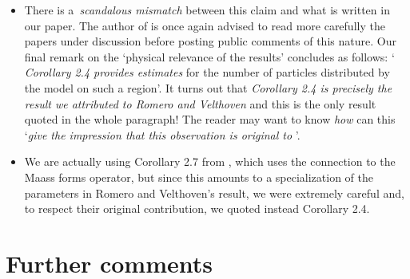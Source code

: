 \documentclass[11pt,reqno]{amsart}
\numberwithin{equation}{section}
\theoremstyle{plain}
\theoremstyle{definition}
\theoremstyle{remark}
\begin{document}
\begin{itemize}
\item There is a\emph{\ scandalous mismatch} between this claim and what is
written in our paper. The author of \cite{Letter} is once again advised to
read more carefully the papers under discussion before posting public
comments of this nature. Our final remark on the `physical relevance of the
results' \cite[Page 9, line -6]{Affine} concludes as follows: `\emph{%
Corollary 2.4 provides estimates} for the number of particles distributed by
the model on such a region'. It turns out that \emph{Corollary 2.4 is
precisely the result we attributed to Romero and Velthoven }\cite{Jordi} and
this is the only result quoted in the whole paragraph! The reader may want
to know \emph{how} can this `\emph{give the impression that this observation
is original to }\cite{Affine}'.

\item We are actually using Corollary 2.7 from \cite{Affine}, which uses the
connection to the Maass forms operator, but since this amounts to a
specialization of the parameters in Romero and Velthoven's result, we were
extremely careful and, to respect their original contribution, we quoted
instead Corollary 2.4.
\end{itemize}

\section{\textbf{Further comments}}
\end{document}
